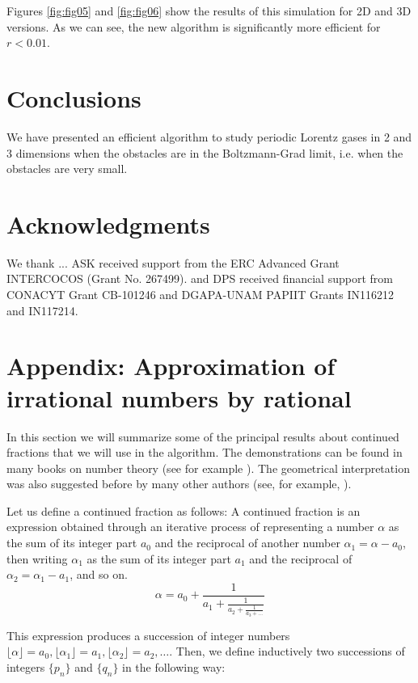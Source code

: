 \documentclass[prl,amsmath,amssymb, twocolumn, showpacs]{revtex4-1}
\begin{document}
Figures \ref{fig:fig05} and \ref{fig:fig06} show the results of this simulation for 2D and 3D versions. As we can see, the new algorithm is significantly more efficient for $r < 0.01$.





\section{Conclusions}  

We have presented an efficient algorithm to study periodic Lorentz gases in 2 and 3 dimensions when the obstacles are in the Boltzmann-Grad limit, i.e. when the obstacles are very small. 

\section{Acknowledgments}  
We thank ... ASK received support from the ERC Advanced Grant
INTERCOCOS (Grant No. 267499). and DPS received financial support from CONACYT Grant CB-101246 and DGAPA-UNAM PAPIIT Grants
IN116212 and IN117214.


\section{Appendix: Approximation of irrational numbers by rational}

In this section we will summarize some of the principal results about continued fractions that we will use in the algorithm. The demonstrations can be found in many books on number theory (see for example \cite{niven2008introduction}). The geometrical interpretation was also suggested before by many other authors (see, for example, \cite{nogueira1995three}). 

Let us define a continued fraction as follows:
A continued fraction is an expression obtained through an iterative process of representing a number $\alpha$ as the sum of its integer part $a_0$ and the reciprocal of another number $\alpha_1=\alpha-a_0$, then writing $\alpha_1$ as the sum of its integer part $a_1$ and the reciprocal of $\alpha_2=\alpha_1-a_1$, and so on. 
\begin{equation*}
  \alpha = a_0 + \frac{1}{\displaystyle a_1
          + \frac{1}{\displaystyle a_2
          + \frac{1}{\displaystyle a_3 + \dots}}}
\end{equation*}

This expression produces a succession of integer numbers $\lfloor \alpha \rfloor=a_0,\lfloor \alpha_1 \rfloor=a_1, \lfloor \alpha_2 \rfloor=a_2, \dots$. 
Then, we define inductively two successions of integers $\{ p_n\}$ and $\{ q_n\}$ in the following way:
\end{document}
